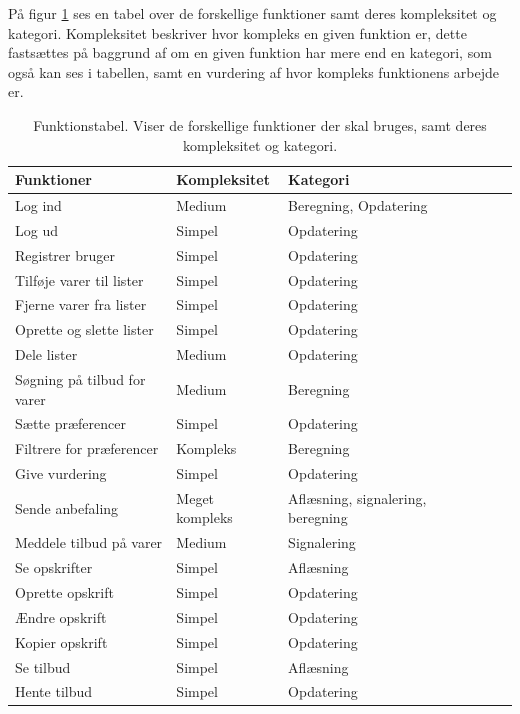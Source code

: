 På figur \ref{tabel:functionstable} ses en tabel over de forskellige funktioner samt deres kompleksitet og kategori.
Kompleksitet beskriver hvor kompleks en given funktion er, dette fastsættes på baggrund af om en given funktion har mere end en kategori, som også kan ses i tabellen, samt en vurdering af hvor kompleks funktionens arbejde er.

\begin{table}[H]
  \centering
      \begin{tabular}{l|lllll}
      \textbf{Funktioner}			& {Kompleksitet}	& {Kategori}  	\\ \hline
      Log ind						& Medium			& Beregning, Opdatering		\\
      Log ud						& Simpel			& Opdatering	\\
      Registrer bruger				& Simpel			& Opdatering	\\
      Tilføje varer til lister		& Simpel       		& Opdatering	\\
      Fjerne varer fra lister		& Simpel       		& Opdatering	\\
      Oprette og slette lister		& Simpel       		& Opdatering	\\
      Dele lister					& Medium       		& Opdatering	\\
      Søgning på tilbud for varer   & Medium     		& Beregning		\\
      Sætte præferencer				& Simpel       		& Opdatering	\\
      Filtrere for præferencer		& Kompleks     		& Beregning		\\
      Give vurdering				& Simpel       		& Opdatering	\\
      Sende anbefaling				& Meget kompleks	& Aflæsning, signalering, beregning		\\
      Meddele tilbud på varer		& Medium      		& Signalering	\\
	    Se opskrifter					& Simpel       		& Aflæsning		\\
      Oprette opskrift      & Simpel          & Opdatering  \\
      Ændre opskrift        & Simpel          & Opdatering \\
      Kopier opskrift       & Simpel          & Opdatering \\
	    Se tilbud						& Simpel       		& Aflæsning		\\
      Hente tilbud					& Simpel	       	& Opdatering	\\
    \end{tabular}
  \caption{Funktionstabel. Viser de forskellige funktioner der skal bruges, samt deres kompleksitet og kategori.}\label{tabel:functionstable}
\end{table}


